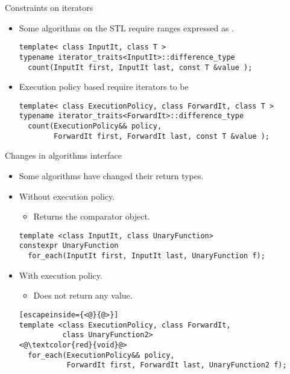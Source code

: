 \begin{frame}[t,fragile]{Constraints on iterators}
\begin{itemize}
  \item Some algorithms on the STL require ranges expressed
        as .
\begin{lstlisting}
template< class InputIt, class T >
typename iterator_traits<InputIt>::difference_type
  count(InputIt first, InputIt last, const T &value );
\end{lstlisting}

  \item Execution policy based require iterators to be
\begin{lstlisting}
template< class ExecutionPolicy, class ForwardIt, class T >
typename iterator_traits<ForwardIt>::difference_type
  count(ExecutionPolicy&& policy, 
        ForwardIt first, ForwardIt last, const T &value );
\end{lstlisting}
\end{itemize}
\end{frame}

\begin{frame}[t,fragile]{Changes in algorithms interface}
\begin{itemize}
  \item Some algorithms have changed their return types.
  \vfill\pause
  \item Without execution policy.
    \begin{itemize}
      \item Returns the comparator object.
    \end{itemize}
\begin{lstlisting}
template <class InputIt, class UnaryFunction>
constexpr UnaryFunction 
  for_each(InputIt first, InputIt last, UnaryFunction f);
\end{lstlisting}
  \vfill\pause
  \item With execution policy.
    \begin{itemize}
      \item Does not return any value.
    \end{itemize}
\begin{lstlisting}[escapeinside={<@}{@>}]
template <class ExecutionPolicy, class ForwardIt, 
          class UnaryFunction2>
<@\textcolor{red}{void}@>
  for_each(ExecutionPolicy&& policy, 
           ForwardIt first, ForwardIt last, UnaryFunction2 f);
\end{lstlisting}
\end{itemize}
\end{frame}

